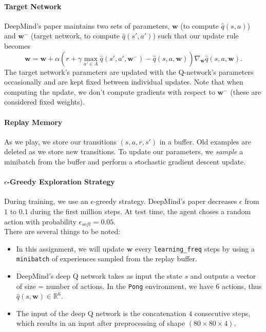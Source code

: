 \documentclass{article}
\begin{document}
\paragraph{Target Network}
DeepMind's paper \cite{mnih2015human} \cite{mnih-atari-2013} maintains two sets of parameters, $\textbf{w}$ (to compute $ \hat{q}(s, a)$) and $\textbf{w}^-$ (target network, to compute $ \hat{q}(s', a') $) such that our update rule becomes
\begin{equation}
\textbf{w} = \textbf{w} + \alpha\left(r+\gamma \max_{a' \in A}\hat{q}\left(s',a', \textbf{w}^- \right) - \hat{q}\left(s, a, \textbf{w} \right)\right) \nabla_{\textbf{w}} \hat{q}(s,a, \textbf{w}).
\end{equation}
The target network's parameters are updated with the Q-network's parameters occasionally and are kept fixed between individual updates. Note that when computing the update, we don't compute gradients with respect to $ \textbf{w}^- $ (these are considered fixed weights).

\paragraph{Replay Memory}
As we play, we store our transitions $ (s, a, r, s') $ in a buffer. Old examples are deleted as we store new transitions. To update our parameters, we \emph{sample} a minibatch from the buffer and perform a stochastic gradient descent update.

\paragraph{$\epsilon$-Greedy Exploration Strategy}
During training, we use an $ \epsilon $-greedy strategy. DeepMind's paper \cite{mnih2015human} \cite{mnih-atari-2013} decreases $ \epsilon $ from $ 1 $ to $ 0.1 $ during the first million steps. At test time, the agent choses a random action with probability $ \epsilon_{soft} = 0.05 $.\\

There are several things to be noted:
\begin{itemize}
\item In this assignment, we will update $ \textbf{w} $ every \texttt{learning\_freq} steps by using a \texttt{minibatch} of experiences sampled from the replay buffer.

\item DeepMind's deep Q network takes as input the state $ s $ and outputs a vector of size = number of actions. In the \texttt{Pong} environment, we have $ 6 $ actions, thus
$ \hat{q}(s, \textbf{w}) \in \mathbb{R}^{6} $.    
\item The input of the deep Q network is the concatenation $ 4 $ consecutive steps, which results in an input after preprocessing of shape $ (80 \times 80 \times 4) $.
\end{itemize}
\end{document}
